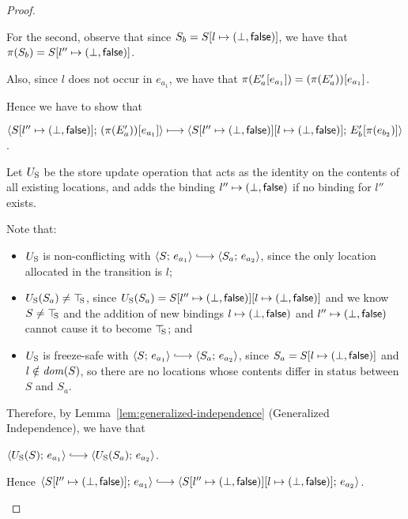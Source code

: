 \begin{proof}
\begin{enumerate}
\begin{enumerate}
\begin{itemize}
        For the second, observe that since $S_b =
        S[l \mapsto (\bot, \textsf{false})]$, we have that $\pi(S_b) =
        S[l'' \mapsto (\bot, \textsf{false})]$.

        Also, since $l$ does not occur in $e_{a_1}$, we have that
        $\pi(E'_a\hspace{-0.5mm}\left[e_{a_1}\right]) =
        (\pi(E'_a))\hspace{-0.5mm}\left[e_{a_1}\right]$.

        Hence we have to show that

        $\langle S[l'' \mapsto (\bot, \textsf{false})];\, (\pi(E'_a))\hspace{-0.5mm}\left[e_{a_1}\right] \rangle
        \longmapsto \\
        \langle S[l'' \mapsto (\bot, \textsf{false})][l \mapsto (\bot, \textsf{false})];\, E'_b\hspace{-0.5mm}\left[\pi(e_{b_2})\right] \rangle$.

        Let $U_{\mathrm{S}}$ be the store update operation that acts as the
        identity on the contents of all existing locations, and adds
        the binding $l'' \mapsto (\bot, \textsf{false})$ if no
        binding for $l''$ exists.

        Note that:
        \begin{itemize}
        \item $U_{\mathrm{S}}$ is non-conflicting with $\config{S}{e_{a_1}}
          \parstepsto \config{S_a}{e_{a_2}}$, since the only
          location allocated in the transition is $l$;
        \item $U_{\mathrm{S}}(S_a) \neq \top\hspace{-0.85mm}_{\mathrm{S}}$, since $U_{\mathrm{S}}(S_a) =
          S[l'' \mapsto (\bot, \textsf{false})][l \mapsto (\bot, \textsf{false})]$
          and we know $S \neq \top\hspace{-0.85mm}_{\mathrm{S}}$ and the addition of new
          bindings $l \mapsto (\bot, \textsf{false})$ and
          $l'' \mapsto (\bot, \textsf{false})$ cannot cause it
          to become $\top\hspace{-0.85mm}_{\mathrm{S}}$; and
        \item $U_{\mathrm{S}}$ is freeze-safe with $\config{S}{e_{a_1}}
          \parstepsto \config{S_a}{e_{a_2}}$, since $S_a =
          S[l \mapsto (\bot, \textsf{false})]$ and $l \notin \mathit{dom}(S)$,
          so there are no locations whose contents differ in status
          between $S$ and $S_a$.
        \end{itemize}

        Therefore, by Lemma~\ref{lem:generalized-independence}
        (Generalized Independence), we have that

        $\config{\Ustore(S)}{e_{a_1}} \parstepsto
        \config{\Ustore(S_a)}{e_{a_2}}$.

        Hence $\config{\extS{S}{l''}{\bot}{\frozenfalse}}{e_{a_1}}
        \parstepsto
        \config{\extS{\extS{S}{l''}{\bot}{\frozenfalse}}{l}{\bot}{\frozenfalse}}{e_{a_2}}$.


\end{itemize}
\end{enumerate}
\end{enumerate}
\end{proof}
